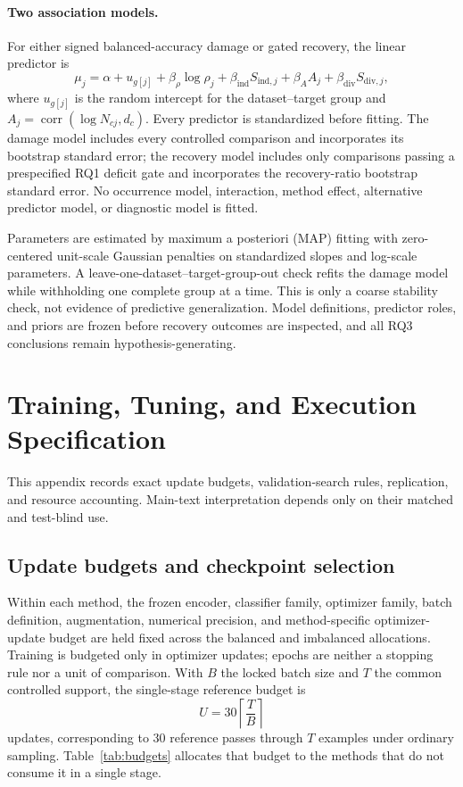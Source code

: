 \documentclass[11pt]{article}
\begin{document}
\paragraph{Two association models.}
For either signed balanced-accuracy damage or gated recovery, the linear predictor is
\begin{equation}
  \mu_j=\alpha+u_{g[j]}+\beta_\rho\log\rho_j
  +\beta_{\mathrm{ind}}S_{\mathrm{ind},j}
  +\beta_A A_j+\beta_{\mathrm{div}}S_{\mathrm{div},j},
  \label{eq:rq3-model}
\end{equation}
\noindent where $u_{g[j]}$ is the random intercept for the dataset--target group and $A_j=\operatorname{corr}(\log N_{cj},d_c)$. Every predictor is standardized before fitting. The damage model includes every controlled comparison and incorporates its bootstrap standard error; the recovery model includes only comparisons passing a prespecified RQ1 deficit gate and incorporates the recovery-ratio bootstrap standard error. No occurrence model, interaction, method effect, alternative predictor model, or diagnostic model is fitted.

Parameters are estimated by maximum a posteriori (MAP) fitting with zero-centered unit-scale Gaussian penalties on standardized slopes and log-scale parameters. A leave-one-dataset--target-group-out check refits the damage model while withholding one complete group at a time. This is only a coarse stability check, not evidence of predictive generalization. Model definitions, predictor roles, and priors are frozen before recovery outcomes are inspected, and all RQ3 conclusions remain hypothesis-generating.

\section{Training, Tuning, and Execution Specification}
\label{app:training}
This appendix records exact update budgets, validation-search rules, replication, and resource accounting. Main-text interpretation depends only on their matched and test-blind use.

\subsection{Update budgets and checkpoint selection}
Within each method, the frozen encoder, classifier family, optimizer family, batch definition, augmentation, numerical precision, and method-specific optimizer-update budget are held fixed across the balanced and imbalanced allocations. Training is budgeted only in optimizer updates; epochs are neither a stopping rule nor a unit of comparison. With $B$ the locked batch size and $T$ the common controlled support, the single-stage reference budget is
\begin{equation}
  U=30\left\lceil\frac{T}{B}\right\rceil
  \label{eq:update-budget}
\end{equation}
\noindent updates, corresponding to 30 reference passes through $T$ examples under ordinary sampling. Table~\ref{tab:budgets} allocates that budget to the methods that do not consume it in a single stage.
\end{document}
